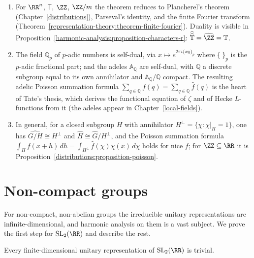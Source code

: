 \begin{example}\label{harmonic-analysis:example-pontryagin}
\begin{enumerate}
\item For $\RR^n$, $\mathbb{T}$, $\ZZ$, $\ZZ/m$ the theorem reduces to Plancherel's theorem (Chapter~\ref{distributions}), Parseval's identity, and the finite Fourier transform (Theorem~\ref{representation-theory:theorem-finite-fourier}). Duality is
visible in Proposition~\ref{harmonic-analysis:proposition-characters-r}: $\widehat{\widehat{\mathbb{T}}} = \widehat{\ZZ} = \mathbb{T}$.
\item The field $\mathbb{Q}_p$ of $p$-adic numbers is self-dual, via $x \mapsto e^{2\pi i\{xy\}_p}$ where $\{\ \}_p$ is the $p$-adic fractional part; and the adeles $\mathbb{A}_\mathbb{Q}$ are self-dual, with $\mathbb{Q}$
a discrete subgroup equal to its own annihilator and $\mathbb{A}_\mathbb{Q}/\mathbb{Q}$ compact. The resulting adelic Poisson summation formula $\sum_{q \in \mathbb{Q}}f(q) = \sum_{q \in \mathbb{Q}}\hat f(q)$ is the heart of
Tate's thesis, which derives the functional equation of $\zeta$ and of Hecke $L$-functions from it (the adeles appear in Chapter~\ref{local-fields}).
\item In general, for a closed subgroup $H$ with annihilator $H^\perp = \{\chi : \chi|_H = 1\}$, one has $\widehat{G/H} \cong H^\perp$ and $\widehat H \cong \widehat G/H^\perp$, and the Poisson summation formula
$\int_Hf(x + h)\,dh = \int_{H^\perp}\hat f(\chi)\chi(x)\,d\chi$ holds for nice $f$; for $\ZZ \subseteq \RR$ it is Proposition~\ref{distributions:proposition-poisson}.
\end{enumerate}
\end{example}

\section{Non-compact groups}\label{harmonic-analysis:section-noncompact}

For non-compact, non-abelian groups the irreducible unitary representations are infinite-dimensional, and harmonic analysis on them is a vast subject. We prove the first step for $\mathrm{SL}_2(\RR)$ and describe
the rest.

\begin{proposition}\label{harmonic-analysis:proposition-sl2-no-finite}
Every finite-dimensional unitary representation of $\mathrm{SL}_2(\RR)$ is trivial.
\end{proposition}

